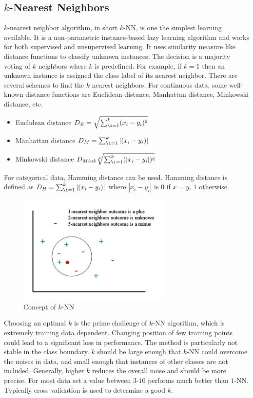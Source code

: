 \subsection{$k$-Nearest Neighbors}
$k$-nearest neighbor algorithm, in short $k$-NN, is one the simplest learning available. It is a non-parametric instance-based lazy learning algorithm and works for both supervised and unsupervised learning. It uses similarity measure like distance functions to classify unknown instances. The decision is a majority voting of  $k$ neighbors where $k$ is predefined. For example, if $k= 1$ then an unknown instance is assigned the class label of its nearest neighbor. There are several schemes to find the $k$ nearest neighbors. For continuous data, some well-known distance functions are Euclidean distance, Manhattan distance, Minkowski distance, etc.
\begin{itemize}
    \item Euclidean distance $D_E = \sqrt{\sum_{\i =1 }^{k} (x_i - y_i)^2}$
    \item Manhattan distance $D_M = \sum_{\i =1 }^{k} |(x_i - y_i)|$
    \item Minkowski distance $D_{Mink}\sqrt[q]{\sum_{\i =1 }^{k} (|x_i - y_i|)^q}$
\end{itemize}
For categorical data, Hamming distance can be used. Hamming distance is defined as $D_H = \sum_{\i =1 }^{k} |(x_i - y_i)|$ where $|x_i - y_i|$ is $0$ if $x=y$, $1$ otherwise.

\begin{figure}[htbp]
    \begin{center}
        \includegraphics[width=3.0in]{figs/knn.jpg}
        \caption{Concept of $k$-NN}
        \label{fig:bg:knn}
    \end{center}
\end{figure}

Choosing an optimal $k$ is the prime challenge of $k$-NN algorithm, which is extremely training data dependent. Changing position of few training points could lead to a significant loss in performance. The method is particularly not stable in the class boundary. $k$ should be large enough that $k$-NN could overcome the noises in data, and small enough that instances of other classes are not included. Generally, higher $k$ reduces the overall noise and should be more precise. For most data set a value between $3$-$10$ performs much better than $1$-NN. Typically cross-validation is used to determine a good $k$. 

